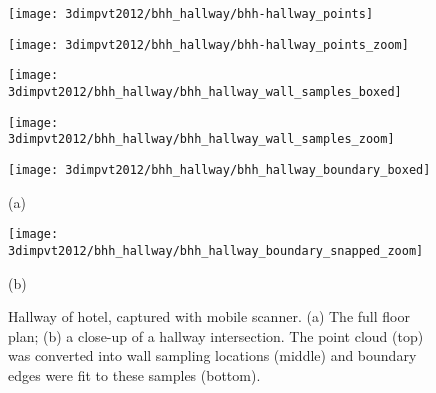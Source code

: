 \documentclass[12pt,onecolumn,oneside]{book}
\begin{document}
\begin{figure}

\centering
\begin{minipage}[b]{0.335\linewidth}
  \centering
  \centerline{\texttt{[image: 3dimpvt2012/bhh\_hallway/bhh-hallway\_points]}}
\end{minipage}
\begin{minipage}[b]{0.3\linewidth}
  \centering
  \centerline{\texttt{[image: 3dimpvt2012/bhh\_hallway/bhh-hallway\_points\_zoom]}}
\end{minipage}
\linebreak 
\linebreak 

\begin{minipage}[b]{0.3\linewidth}
  \centering
  \centerline{\texttt{[image: 3dimpvt2012/bhh\_hallway/bhh\_hallway\_wall\_samples\_boxed]}}
\end{minipage}
\begin{minipage}[b]{0.3\linewidth}
  \centering
  \centerline{\texttt{[image: 3dimpvt2012/bhh\_hallway/bhh\_hallway\_wall\_samples\_zoom]}}
\end{minipage}
\linebreak
\linebreak 

\begin{minipage}[b]{0.3\linewidth}
  \centering
  \centerline{\texttt{[image: 3dimpvt2012/bhh\_hallway/bhh\_hallway\_boundary\_boxed]}}
  \centerline{(a)}
\end{minipage}
\begin{minipage}[b]{0.3\linewidth}
  \centering
  \centerline{\texttt{[image: 3dimpvt2012/bhh\_hallway/bhh\_hallway\_boundary\_snapped\_zoom]}}
  \centerline{(b)}
\end{minipage}
\linebreak 
\linebreak 

\caption[Hallway of hotel, captured with mobile scanner.]{Hallway of hotel, captured with mobile scanner.  (a) The full floor plan; (b) a close-up of a hallway intersection.  The point cloud (top) was converted into wall sampling locations (middle) and boundary edges were fit to these samples (bottom).}
\label{fig:bhh_hallway_results}

\end{figure}

\end{document}
